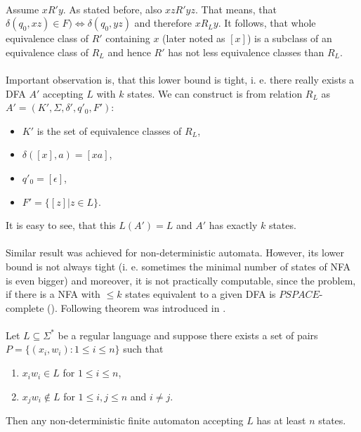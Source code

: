 \paragraph{}
Assume $xR'y$. As stated before, also $xzR'yz$. That means, that $\delta (q_{0}, xz) \in F) \Leftrightarrow \delta (q_{0}, yz)$ and therefore $xR_{L}y$. It follows, that whole equivalence class of $R'$ containing $x$ (later noted as $[x]$) is a subclass of an equivalence class of $R_{L}$ and hence $R'$ has not less equivalence classes than $R_{L}$. \square

\paragraph{}
Important observation is, that this lower bound is tight, i. e. there really exists a DFA $A'$ accepting $L$ with $k$ states. We can construct is from relation $R_{L}$ as $A'=(K', \Sigma , \delta ', q'_{0}, F')$:
\begin{itemize}
\item $K'$ is the set of equivalence classes of $R_{L}$, 
\item $\delta ([x], a) = [xa]$,
\item $q'_{0} = [\epsilon ]$,
\item $F' = \{ [z] | z \in L \}$.
\end{itemize}
It is easy to see, that this $L(A') = L$ and $A'$ has exactly $k$ states.

\paragraph{}
Similar result was achieved for non-deterministic automata. However, its lower bound is not always tight (i. e. sometimes the minimal number of states of NFA is even bigger) and moreover, it is not practically computable, since the problem, if there is a NFA with $\leq k$ states equivalent to a given DFA is $PSPACE$-complete (\cite{rav:minNFA}). Following theorem was introduced in \cite{gla:low}.

\paragraph{}
\cveta Let $L \subseteq \Sigma ^{*}$ be a regular language and suppose there exists a set of pairs $P=\{ (x_{i}, w_{i}): 1 \leq i \leq n\} $ such that
\begin{enumerate}
\item $x_{i}w_{i} \in L$ for $1 \leq i \leq n$,
\item $x_{j}w_{i} \notin L$ for $1 \leq i,j \leq n$ and $i \neq j$.
\end{enumerate}
Then any non-deterministic finite automaton accepting $L$ has at least $n$ states.

